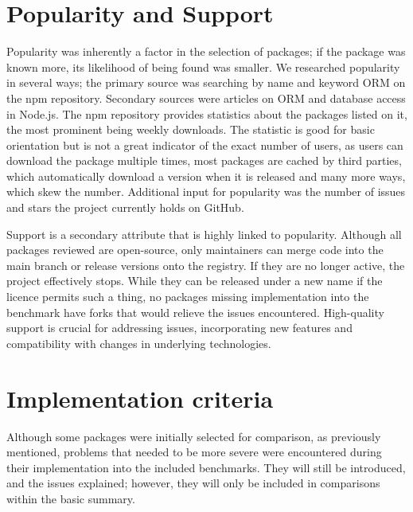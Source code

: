 \section{Popularity and Support}
Popularity was inherently a factor in the selection of packages; if the package was known more, its likelihood of being found was smaller. We researched popularity in several ways; the primary source was searching by name and keyword ORM on the npm repository. Secondary sources were articles on ORM and database access in Node.js. The npm repository provides statistics about the packages listed on it, the most prominent being weekly downloads. The statistic is good for basic orientation but is not a great indicator of the exact number of users, as users can download the package multiple times, most packages are cached by third parties, which automatically download a version when it is released and many more ways, which skew the number. Additional input for popularity was the number of issues and stars the project currently holds on GitHub.\par
Support is a secondary attribute that is highly linked to popularity. Although all packages reviewed are open-source, only maintainers can merge code into the main branch or release versions onto the registry. If they are no longer active, the project effectively stops. While they can be released under a new name if the licence permits such a thing, no packages missing implementation into the benchmark have forks that would relieve the issues encountered. High-quality support is crucial for addressing issues, incorporating new features and compatibility with changes in underlying technologies.\par
\section{Implementation criteria}
Although some packages were initially selected for comparison, as previously mentioned, problems that needed to be more severe were encountered during their implementation into the included benchmarks. They will still be introduced, and the issues explained; however, they will only be included in comparisons within the basic summary.
